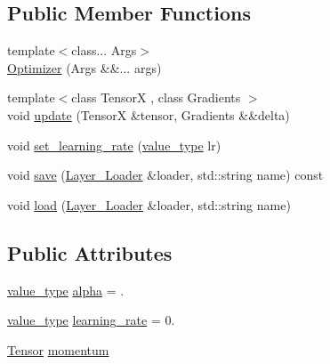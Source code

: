 \subsection*{Public Member Functions}
\begin{DoxyCompactItemize}
\item 
{\footnotesize template$<$class... Args$>$ }\\\hyperlink{structbc_1_1nn_1_1Momentum_1_1Optimizer_a3d02f515c3cc2724dceb35ff0932b173}{Optimizer} (Args \&\&... args)
\item 
{\footnotesize template$<$class TensorX , class Gradients $>$ }\\void \hyperlink{structbc_1_1nn_1_1Momentum_1_1Optimizer_a93b6491d017c68b34a6aa7dcd5ab583f}{update} (TensorX \&tensor, Gradients \&\&delta)
\item 
void \hyperlink{structbc_1_1nn_1_1Momentum_1_1Optimizer_ada29fdc99e684aceb5a15ca458554c22}{set\+\_\+learning\+\_\+rate} (\hyperlink{structbc_1_1nn_1_1Momentum_1_1Optimizer_a53cb161fe0dd2fa29c1647d36e424d35}{value\+\_\+type} lr)
\item 
void \hyperlink{structbc_1_1nn_1_1Momentum_1_1Optimizer_a66b94850c3ddec0abe3186305e3354ba}{save} (\hyperlink{structbc_1_1nn_1_1Layer__Loader}{Layer\+\_\+\+Loader} \&loader, std\+::string name) const
\item 
void \hyperlink{structbc_1_1nn_1_1Momentum_1_1Optimizer_ad33161200f366bc291c9b77b6ca04137}{load} (\hyperlink{structbc_1_1nn_1_1Layer__Loader}{Layer\+\_\+\+Loader} \&loader, std\+::string name)
\end{DoxyCompactItemize}
\subsection*{Public Attributes}
\begin{DoxyCompactItemize}
\item 
\hyperlink{structbc_1_1nn_1_1Momentum_1_1Optimizer_a53cb161fe0dd2fa29c1647d36e424d35}{value\+\_\+type} \hyperlink{structbc_1_1nn_1_1Momentum_1_1Optimizer_adcadc7f2145fd214e70f269849dd4bd6}{alpha} = .
\item 
\hyperlink{structbc_1_1nn_1_1Momentum_1_1Optimizer_a53cb161fe0dd2fa29c1647d36e424d35}{value\+\_\+type} \hyperlink{structbc_1_1nn_1_1Momentum_1_1Optimizer_a1b81320c5220f75b8b6311ff9763cf1e}{learning\+\_\+rate} = 0.
\item 
\hyperlink{namespacebc_a659391e47ab612be3ba6c18cf9c89159}{Tensor} \hyperlink{structbc_1_1nn_1_1Momentum_1_1Optimizer_ab414f9793b1f7b1484fac6c30087ddc0}{momentum}
\end{DoxyCompactItemize}


